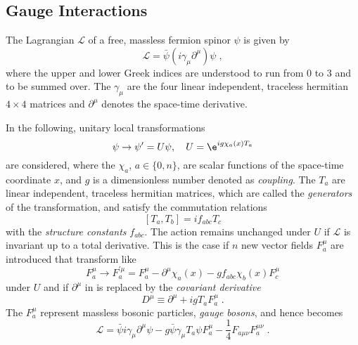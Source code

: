 \subsection{Gauge Interactions}\label{sec:Theory:SM:GaugeInteractions}
The Lagrangian $\mathcal{L}$ of a free, massless fermion spinor $\psi$ is given by
\begin{equation}
  \label{eq:Theory:SM:FreeFermionLagrangian}
  \mathcal{L} = \bar{\psi}\left(i\gamma_{\mu}\partial^{\mu}\right)\psi \;,
\end{equation}
where the upper and lower Greek indices are understood to run from 0 to 3 and to be summed over.
The $\gamma_{\mu}$ are the four linear independent, traceless hermitian \mbox{$4\times4$} matrices and $\partial^{\mu}$ denotes the space-time derivative.

In the following, unitary local transformations
\begin{equation*}
  \psi\rightarrow\psi'=U\psi ,\quad U = \e^{ig\chi_{a}(x)T_{a}}
\end{equation*}
are considered, where the $\chi_{a}$, \mbox{$a\in\{0,n\}$}, are scalar functions of the space-time coordinate $x$, and $g$ is a dimensionless number denoted as \emph{coupling}.
The $T_{a}$ are linear independent, traceless hermitian matrices, which are called the \emph{generators} of the transformation, and satisfy the commutation relations
\begin{equation*}
  \left[T_{a},T_{b}\right] = if_{abc}T_{c}
\end{equation*}
with the \emph{structure constants} $f_{abc}$.
The action remains unchanged under $U$ if $\mathcal{L}$ is invariant up to a total derivative.
This is the case if $n$ new vector fields $F^{\mu}_{a}$ are introduced that transform like
\begin{equation*}
  F^{\mu}_{a} \rightarrow F^{'\mu}_{a} = F^{\mu}_{a} - \partial^{\mu}\chi_{a}(x) - gf_{abc}\chi_{b}(x)F^{\mu}_{c} 
\end{equation*}
under $U$ and if $\partial^{\mu}$ in  is replaced by the \emph{covariant derivative}
\begin{equation*}
  D^{\mu} \equiv \partial^{\mu} + igT_{a}F^{\mu}_{a} \;.
\end{equation*}
The $F^{\mu}_{a}$ represent massless bosonic particles, \emph{gauge bosons}, and hence  becomes
\begin{equation}
  \label{eq:Theory:SM:InvariantFermionLagrangian}
  \mathcal{L} = \bar{\psi}i\gamma_{\mu}\partial^{\mu}\psi - g\bar{\psi}\gamma_{\mu}T_{a}\psi F^{\mu}_{a} - \frac{1}{4}F_{a\mu\nu}F^{\mu\nu}_{a} \;.
\end{equation}
